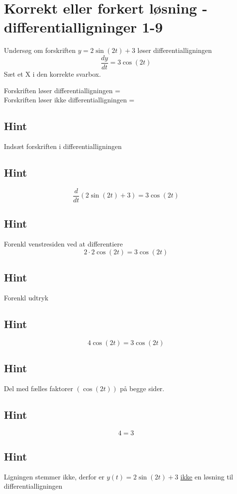 \documentclass{article}
\newenvironment{exercise}[1]{\newpage\section{#1}}{}
\newcommand{\answerbox}[1]{\fbox{$#1$}}
\newcommand{\hint}{\subsection*{Hint}}
\begin{document}
\begin{exercise}{Korrekt eller forkert løsning - differentialligninger 1-9}
	
	
	Undersøg om forskriften $y = 2 \sin(2t) + 3$ løser differentialligningen
	\[
	\frac{dy}{dt} = 3 \cos(2t)
	\]
	Sæt et X i den korrekte svarbox.
	
	Forskriften løser differentialligningen = \answerbox{} \\
	
	Forskriften løser ikke differentialligningen = \answerbox{X}
	
	\hint
	
	Indsæt forskriften i differentialligningen
	
	\hint
	\[
	\frac{d}{dt} \left(2 \sin(2t) + 3\right) = 3 \cos(2t)
	\]
	
	
	\hint
	
	Forenkl venstresiden ved at differentiere
	\[
	2 \cdot 2 \cos(2t) = 3 \cos(2t)
	\]
	
	\hint
	
	Forenkl udtryk
	
	\hint
	\[
	4 \cos(2t) = 3 \cos(2t)
	\]
	
	\hint
	Del med fælles faktorer $\left(\cos(2t) \right)$ på begge sider.
	
	\hint
	
	\[
	4 = 3
	\]
	
	
	\hint
	
	Ligningen stemmer ikke, derfor er $y(t) = 2 \sin(2t) + 3$ \underline{ikke} en løsning til differentialligningen
	
\end{exercise}

\newpage
\end{document}
